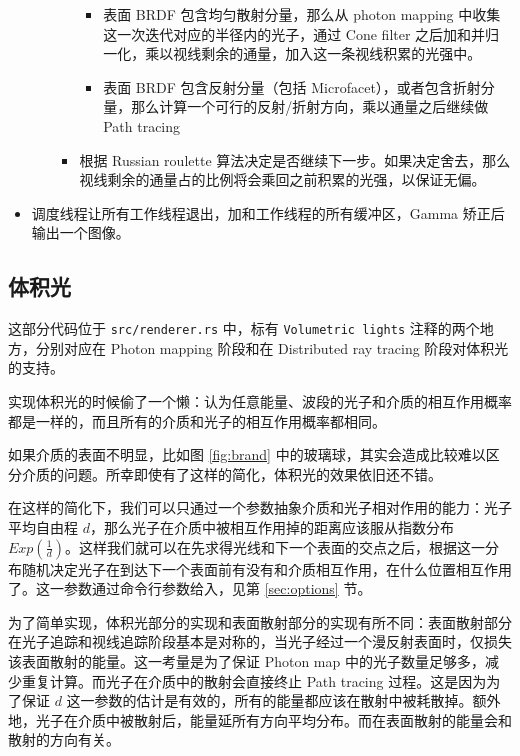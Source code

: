 \documentclass{ctexart}
\begin{document}
\begin{itemize}
\begin{itemize}
\begin{itemize}
      \begin{itemize}
        \item 表面 BRDF 包含均匀散射分量，那么从 photon mapping 中收集这一次迭代对应的半径内的光子，通过 Cone filter 之后加和并归一化，乘以视线剩余的通量，加入这一条视线积累的光强中。
        \item 表面 BRDF 包含反射分量（包括 Microfacet），或者包含折射分量，那么计算一个可行的反射/折射方向，乘以通量之后继续做 Path tracing
      \end{itemize}
      \item 根据 Russian roulette 算法决定是否继续下一步。如果决定舍去，那么视线剩余的通量占的比例将会乘回之前积累的光强，以保证无偏。
    \end{itemize}
  \end{itemize}
  \item 调度线程让所有工作线程退出，加和工作线程的所有缓冲区，Gamma 矫正后输出一个图像。
\end{itemize}

\subsection{体积光}
\label{sec:vol}

这部分代码位于 \texttt{src/renderer.rs} 中，标有 \texttt{Volumetric lights} 注释的两个地方，分别对应在 Photon mapping 阶段和在 Distributed ray tracing 阶段对体积光的支持。

实现体积光的时候偷了一个懒：认为任意能量、波段的光子和介质的相互作用概率都是一样的，而且所有的介质和光子的相互作用概率都相同。

如果介质的表面不明显，比如图 \ref{fig:brand} 中的玻璃球，其实会造成比较难以区分介质的问题。所幸即使有了这样的简化，体积光的效果依旧还不错。

在这样的简化下，我们可以只通过一个参数抽象介质和光子相对作用的能力：光子平均自由程 $d$，那么光子在介质中被相互作用掉的距离应该服从指数分布 $Exp(\frac{1}{d})$。这样我们就可以在先求得光线和下一个表面的交点之后，根据这一分布随机决定光子在到达下一个表面前有没有和介质相互作用，在什么位置相互作用了。这一参数通过命令行参数给入，见第 \ref{sec:options} 节。

为了简单实现，体积光部分的实现和表面散射部分的实现有所不同：表面散射部分在光子追踪和视线追踪阶段基本是对称的，当光子经过一个漫反射表面时，仅损失该表面散射的能量。这一考量是为了保证 Photon
map 中的光子数量足够多，减少重复计算。而光子在介质中的散射会直接终止 Path tracing 过程。这是因为为了保证 $d$ 这一参数的估计是有效的，所有的能量都应该在散射中被耗散掉。额外地，光子在介质中被散射后，能量延所有方向平均分布。而在表面散射的能量会和散射的方向有关。
\end{document}
